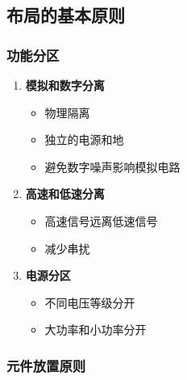 \subsection{布局的基本原则}

\subsubsection{功能分区}

\begin{enumerate}
  \item \textbf{模拟和数字分离}
    \begin{itemize}
      \item 物理隔离
      \item 独立的电源和地
      \item 避免数字噪声影响模拟电路
    \end{itemize}

  \item \textbf{高速和低速分离}
    \begin{itemize}
      \item 高速信号远离低速信号
      \item 减少串扰
    \end{itemize}

  \item \textbf{电源分区}
    \begin{itemize}
      \item 不同电压等级分开
      \item 大功率和小功率分开
    \end{itemize}
\end{enumerate}

\subsubsection{元件放置原则}


